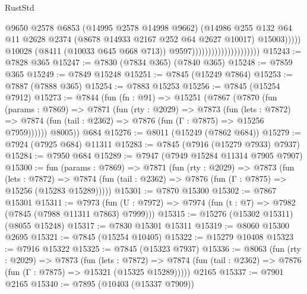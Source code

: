 \begin{lexlean}{RustStd}
\begin{coremodule}
                                                      @9650
                                                      @2578
                                                      @6853
                                                      (@14995 @2578 @14998 @9662)
                                                      (@14986
                                                        @255
                                                        @132
                                                        @64
                                                        @11
                                                        @2628
                                                        @2374
                                                        (@8678 @14933 @2167 @252 @64 @2627 @10017)
                                                        @15003)))))
                                              @10028
                                              (@8411 (@10033 @645 @668 @713))
                                              @9597)))))))))))))))))))))
@15243 := @7828 @365
@15247 := @7830 (@7834 @365) (@7840 @365)
@15248 := @7859 @365
@15249 := @7849 @15248
@15251 := @7845 (@15249 @7864)
@15253 := @7887 (@7888 @365)
@15254 := @7883 @15253
@15256 := @7845 (@15254 @7912)
@15273 := @7844
    (fun (fn : @91) =>
    @15251
      (@7867
        (@7870
          (fun (params : @7869) =>
          @7871
            (fun (rty : @2029) =>
            @7873
              (fun (lets : @7872) =>
              @7874 (fun (tail : @2362) => @7876 (fun (Γ : @7875) => @15256 @7959))))))
        @8005))
    @684
@15276 := @8011 (@15249 (@7862 @684))
@15279 := @7924 (@7925 @684) @11311
@15283 := @7845 (@7916 (@15279 @7933) @7937)
@15284 := @7950 @684
@15289 := @7947 (@7949 @15284 @11314 @7905 @7907)
@15300 := fun (params : @7869) =>
  @7871
    (fun (rty : @2029) =>
    @7873
      (fun (lets : @7872) =>
      @7874 (fun (tail : @2362) => @7876 (fun (Γ : @7875) => @15256 (@15283 @15289)))))
@15301 := @7870 @15300
@15302 := @7867 @15301
@15311 := @7973
    (fun (U : @7972) => @7974 (fun (t : @7) => @7982 (@7845 (@7988 @11311 @7863) @7999)))
@15315 := @15276 (@15302 @15311) (@8055 @15248)
@15317 := @7830 @15301 @15311
@15319 := @8060 @15300 @2695
@15321 := @7845 (@15254 @10405)
@15322 := @15279 @10408
@15323 := @7916 @15322
@15325 := @7845 (@15323 @7937)
@15336 := @8063
    (fun (rty : @2029) =>
    @7873
      (fun (lets : @7872) =>
      @7874 (fun (tail : @2362) => @7876 (fun (Γ : @7875) => @15321 (@15325 @15289)))))
    @2165
@15337 := @7901 @2165
@15340 := @7895 (@10403 (@15337 @7909))

\end{coremodule}
\end{lexlean}
